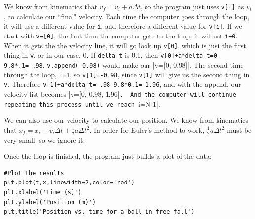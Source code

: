 \documentclass[twoside,11pt,ShortChapTitles]{BYUTextbook}
\begin{document}
We know from kinematics that $v_f=v_i+a\Delta t$, so the program just uses \lstinline[columns=fixed]!v[i]! as $v_i$, to calculate our ``final" velocity.  Each time the computer goes through the loop, it will use a different value for \lstinline[columns=fixed]!i!, and therefore a different value for \lstinline[columns=fixed]!v[i]!.  
If we start with \lstinline[columns=fixed]!v=[0]!, the first time the computer gets to the loop, it will set \lstinline[columns=fixed]!i=0!.  When it gets the the velocity line, it will go look up \lstinline[columns=fixed]!v[0]!, which is just the first thing in \lstinline[columns=fixed]!v!, or in our case, 0.  If \lstinline[columns=fixed]!delta_t! is 0.1, then \lstinline[columns=fixed]!v[0]+a*delta_t=0-9.8*.1=-.98!.  \lstinline[columns=fixed]!v.append(-0.98)! would make our |v=[0,-0.98]|.  The second time through the loop, \lstinline[columns=fixed]!i=1!, so \lstinline[columns=fixed]!v[1]=-0.98!, since \lstinline[columns=fixed]!v[1]! will give us the second thing in \lstinline[columns=fixed]!v!.  Therefore \lstinline[columns=fixed]!v[1]+a*delta_t=-.98-9.8*0.1=-1.96!, and with the append, our velocity list becomes |v=[0,-0.98,-1.96]\lstinline[columns=fixed]!.  And the computer will continue repeating this process until we reach !i=N-1|.

We can also use our velocity to calculate our position.  We know from kinematics that $x_f=x_i+v_i\Delta t+\frac{1}{2}a\Delta t^2$.  In order for Euler's method to work, $\frac{1}{2}a\Delta t^2$ must be very small, so we ignore it.

Once the loop is finished, the program just builds a plot of the data:
\begin{lstlisting}
#Plot the results
plt.plot(t,x,linewidth=2,color='red')
plt.xlabel('time (s)')
plt.ylabel('Position (m)')
plt.title('Position vs. time for a ball in free fall')
\end{lstlisting}
\end{document}
